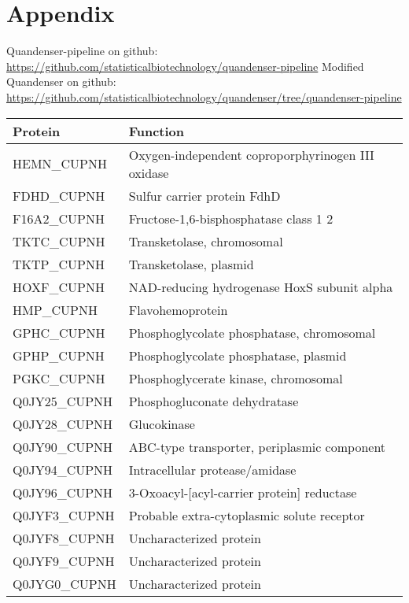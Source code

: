 \section{Appendix}

Quandenser-pipeline on github: \url{https://github.com/statisticalbiotechnology/quandenser-pipeline}
Modified Quandenser on github: \url{https://github.com/statisticalbiotechnology/quandenser/tree/quandenser-pipeline}


\begin{center}
\begin{longtable}{ l l }
\toprule
Protein & Function \\ [0.5ex] \midrule
HEMN\_CUPNH & Oxygen-independent coproporphyrinogen III oxidase \\ [0.5ex]
FDHD\_CUPNH & Sulfur carrier protein FdhD \\ [0.5ex]
F16A2\_CUPNH & Fructose-1,6-bisphosphatase class 1 2 \\ [0.5ex]
TKTC\_CUPNH & Transketolase, chromosomal \\ [0.5ex]
TKTP\_CUPNH & Transketolase, plasmid \\ [0.5ex]
HOXF\_CUPNH & NAD-reducing hydrogenase HoxS subunit alpha \\ [0.5ex]
HMP\_CUPNH & Flavohemoprotein \\ [0.5ex]
GPHC\_CUPNH & Phosphoglycolate phosphatase, chromosomal \\ [0.5ex]
GPHP\_CUPNH & Phosphoglycolate phosphatase, plasmid \\ [0.5ex]
PGKC\_CUPNH & Phosphoglycerate kinase, chromosomal \\ [0.5ex]
Q0JY25\_CUPNH & Phosphogluconate dehydratase \\ [0.5ex]
Q0JY28\_CUPNH & Glucokinase \\ [0.5ex]
Q0JY90\_CUPNH & ABC-type transporter, periplasmic component \\ [0.5ex]
Q0JY94\_CUPNH & Intracellular protease/amidase \\ [0.5ex]
Q0JY96\_CUPNH & 3-Oxoacyl-[acyl-carrier protein] reductase \\ [0.5ex]
Q0JYF3\_CUPNH & Probable extra-cytoplasmic solute receptor \\ [0.5ex]
Q0JYF8\_CUPNH & Uncharacterized protein \\ [0.5ex]
Q0JYF9\_CUPNH & Uncharacterized protein \\ [0.5ex]
Q0JYG0\_CUPNH & Uncharacterized protein \\ [0.5ex]

\end{longtable}
\end{center}
